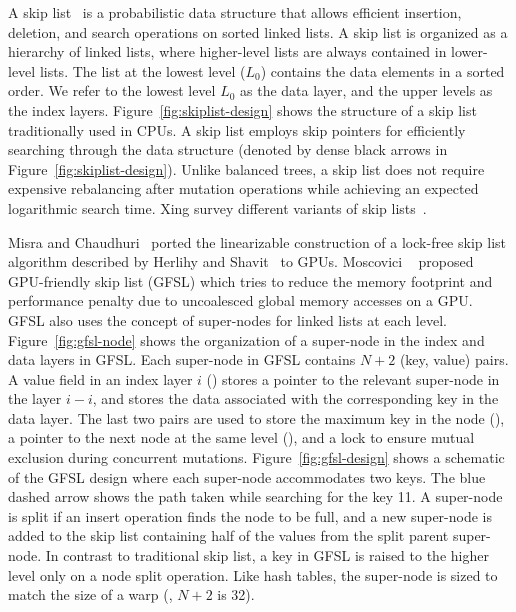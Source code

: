 \documentclass[12pt,a4paper]{article}
\begin{document}
A skip list~\cite{skiplist-cacm-1990} is a probabilistic data structure that
allows efficient insertion, deletion, and search operations on sorted linked
lists.
A skip list is organized as a hierarchy of
linked lists, where higher-level lists are always contained in lower-level
lists. The list at the lowest level ($L_{0}$) contains the data elements in a
sorted order. We refer to the lowest level $L_{0}$ as the data layer, and the
upper levels as the index layers. Figure~\ref{fig:skiplist-design} shows the
structure of a skip list traditionally used in CPUs. A skip list employs skip
pointers for efficiently searching through the data structure (denoted by dense
black arrows in Figure~\ref{fig:skiplist-design}). Unlike balanced trees, a skip
list does not require expensive rebalancing after mutation operations while
achieving an expected logarithmic search time. Xing \etal survey different
variants of skip lists~\cite{skiplist-survey-2025}.

Misra and Chaudhuri~\cite{lockfree-ds-icpads-2012} ported the linearizable
construction of a lock-free skip list algorithm described by Herlihy and
Shavit~\cite{art-of-multiprocessor-programming-v2} to GPUs. Moscovici
\etal~\cite{gfsl-pact-2017} proposed GPU-friendly skip list (GFSL) which tries
to reduce the memory footprint and performance penalty due to uncoalesced global
memory accesses on a GPU. GFSL also uses the concept of super-nodes for linked
lists at each level. Figure~\ref{fig:gfsl-node} shows the organization of a
super-node in the index and data layers in GFSL. Each super-node in GFSL
contains $N + 2$ (key, value) pairs. A value field in an index layer $i$
() stores a pointer to the relevant super-node in the layer $i-i$,
and stores the data associated with the corresponding key in the data layer. The
last two pairs are used to store the maximum key in the node (), a
pointer to the next node at the same level (), and a lock to
ensure mutual exclusion during concurrent mutations.
Figure~\ref{fig:gfsl-design} shows a schematic of the GFSL design where each
super-node accommodates two keys. The blue dashed arrow shows the path taken
while searching for the key 11. A super-node is split if an insert operation
finds the node to be full, and a new super-node is added to the skip list
containing half of the values from the split parent super-node. In contrast to
traditional skip list, a key in GFSL is raised to the higher level only on a
node split operation. Like hash tables, the super-node is sized to match the
size of a warp (\ie, $N + 2$ is 32).
\end{document}
